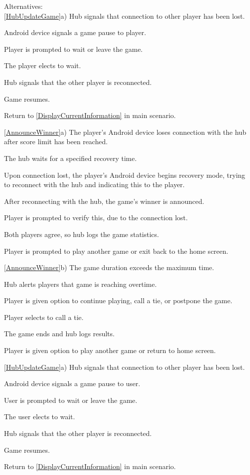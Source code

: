 \documentclass[12pt]{article}
\newenvironment{enumerate*}%
  {\begin{enumerate}%
  	\setlength{\parsep}{0pt}
    \setlength{\itemsep}{0pt}%
    \setlength{\parskip}{0pt}}%
  {\end{enumerate}}
\begin{document}
Alternatives:\\
\ref{HubUpdateGame}a) Hub signals that connection to other player has been lost.
\begin{enumerate*}
\item Android device signals a game pause to player.
\item Player is prompted to wait or leave the game.
\item The player elects to wait.
\item Hub signals that the other player is reconnected.
\item Game resumes.
\item Return to \ref{DisplayCurrentInformation} in main scenario.
\end{enumerate*}
\ref{AnnounceWinner}a) The player's Android device loses connection with the hub after score limit has been reached.
\begin{enumerate*}
\item The hub waits for a specified recovery time.
\item Upon connection lost, the player's Android device begins recovery mode, trying to reconnect with the hub and indicating this to the player.
\item After reconnecting with the hub, the game's winner is announced.  
\item Player is prompted to verify this, due to the connection lost. 
\item Both players agree, so hub logs the game statistics.
\item Player is prompted to play another game or exit back to the home screen.
\end{enumerate*}
\ref{AnnounceWinner}b) The game duration exceeds the maximum time.
\begin{enumerate*}
\item Hub alerts players that game is reaching overtime.
\item Player is given option to continue playing, call a tie, or postpone the game.
\item Player selects to call a tie. 
\item The game ends and hub logs results.
\item Player is given option to play another game or return to home screen.
\end{enumerate*}
\ref{HubUpdateGame}a) Hub signals that connection to other player has been lost.
\begin{enumerate*}
\item Android device signals a game pause to user.
\item User is prompted to wait or leave the game.
\item The user elects to wait.
\item Hub signals that the other player is reconnected.
\item Game resumes.
\item Return to \ref{DisplayCurrentInformation} in main scenario.
\end{enumerate*}
\end{document}
